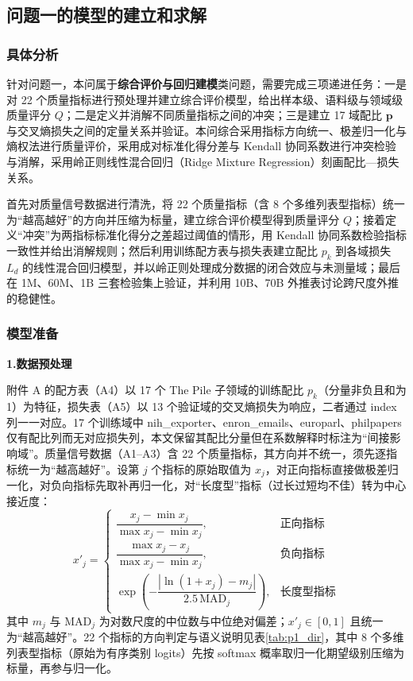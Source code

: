 \subsection{问题一的模型的建立和求解}

\subsubsection{具体分析}

针对问题一，本问属于\textbf{综合评价与回归建模}类问题，需要完成三项递进任务：一是对 22 个质量指标进行预处理并建立综合评价模型，给出样本级、语料级与领域级质量评分 $Q$；二是定义并消解不同质量指标之间的冲突；三是建立 17 域配比 $\bm p$ 与交叉熵损失之间的定量关系并验证。本问综合采用指标方向统一、极差归一化与熵权法进行质量评价，采用成对标准化得分差与 Kendall 协同系数进行冲突检验与消解，采用岭正则线性混合回归（Ridge Mixture Regression）刻画配比—损失关系\cite{xie2023doremi}。

首先对质量信号数据进行清洗，将 22 个质量指标（含 8 个多维列表型指标）统一为“越高越好”的方向并压缩为标量，建立综合评价模型得到质量评分 $Q$；接着定义“冲突”为两指标标准化得分之差超过阈值的情形，用 Kendall 协同系数检验指标一致性并给出消解规则；然后利用训练配方表与损失表建立配比 $p_k$ 到各域损失 $L_d$ 的线性混合回归模型，并以岭正则处理成分数据的闭合效应与未测量域；最后在 1M、60M、1B 三套检验集上验证，并利用 10B、70B 外推表讨论跨尺度外推的稳健性。

\subsubsection{模型准备}

\textbf{1.数据预处理}

附件 A 的配方表（A4）以 17 个 The Pile 子领域的训练配比 $p_k$（分量非负且和为 1）为特征\cite{gao2020pile}，损失表（A5）以 13 个验证域的交叉熵损失为响应，二者通过 index 列一一对应。17 个训练域中 nih\_exporter、enron\_emails、europarl、philpapers 仅有配比列而无对应损失列，本文保留其配比分量但在系数解释时标注为“间接影响域”。质量信号数据（A1--A3）含 22 个质量指标，其方向并不统一，须先逐指标统一为“越高越好”。设第 $j$ 个指标的原始取值为 $x_j$，对正向指标直接做极差归一化，对负向指标先取补再归一化，对“长度型”指标（过长过短均不佳）转为中心接近度：
\begin{equation}
    x'_j = \begin{cases}
        \dfrac{x_j-\min x_j}{\max x_j-\min x_j}, & \text{正向指标}\\[6pt]
        \dfrac{\max x_j-x_j}{\max x_j-\min x_j}, & \text{负向指标}\\[6pt]
        \exp\!\left(-\dfrac{|\ln(1+x_j)-m_j|}{2.5\,\text{MAD}_j}\right), & \text{长度型指标}
    \end{cases}
\end{equation}
其中 $m_j$ 与 $\text{MAD}_j$ 为对数尺度的中位数与中位绝对偏差；$x'_j\in[0,1]$ 且统一为“越高越好”。22 个指标的方向判定与语义说明见表\ref{tab:p1_dir}，其中 8 个多维列表型指标（原始为有序类别 logits）先按 softmax 概率取归一化期望级别压缩为标量，再参与归一化。

